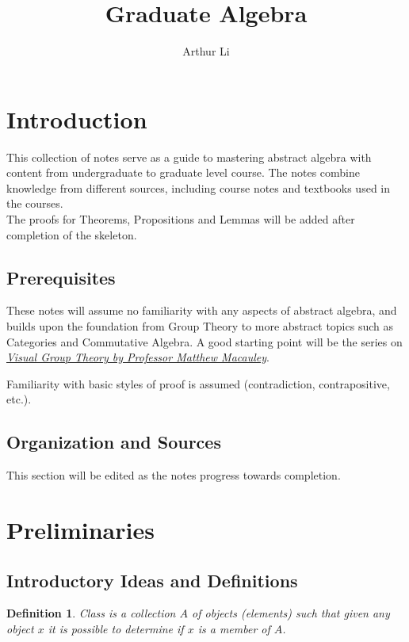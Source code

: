 \documentclass[a4paper,8pt]{article}
\title{Graduate Algebra}
\author{Arthur Li}
\newcommand{\hlt}[1]{\textit{{\color{blue}#1}}}
\theoremstyle{theorem}
\newtheorem{definition}[theorem]{Definition}
\begin{document}
\maketitle


\section*{Introduction}
{This collection} of notes serve as a guide to mastering abstract algebra with content from undergraduate to graduate level course. The notes combine knowledge from different sources, including course notes and textbooks used in the courses.\\

The proofs for Theorems, Propositions and Lemmas will be added after completion of the skeleton.
	
\subsection*{Prerequisites}
These notes will assume no familiarity with any aspects of abstract algebra, and builds upon the foundation from Group Theory to more abstract topics such as Categories and Commutative Algebra. A good starting point will be the series on    \hlt{\href{https://www.youtube.com/watch?v=UwTQdOop-nU&list=PLwV-9DG53NDxU337smpTwm6sef4x-SCLv}{Visual Group Theory by Professor Matthew Macauley}}.
	
Familiarity with basic styles of proof is assumed (contradiction, contrapositive, etc.).
	
\subsection*{Organization and Sources}
This section will be edited as the notes progress towards completion.

\newpage

\tableofcontents

\newpage

\section{Preliminaries}

\subsection{Introductory Ideas and Definitions}

\begin{definition}
\hlt{Class} is a collection $ A $ of objects (elements) such that given any object $ x $ it is possible to determine if $ x $ is a member of $ A $.\\
\end{definition}
\end{document}
